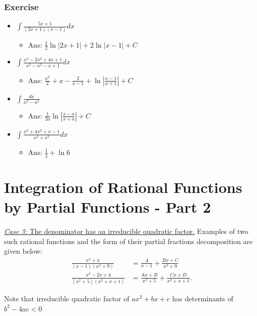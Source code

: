 \documentclass[t]{beamer}
\theoremstyle{plain}
\theoremstyle{definition}
\begin{document}
\begin{frame}
\frametitle{Exercise}

\begin{itemize}
	\item $\displaystyle\int\frac{5x + 1}{(2x + 1)(x-1)}dx$ %
	\begin{itemize}
		\item Ans: $\frac{1}{2}\ln|2x + 1| + 2 \ln|x - 1| + C$
	\end{itemize}
	\item  $\displaystyle\int \frac{x^4 - 2x^2 + 4x + 1}{x^3 - x^2 - x + 1}dx$ %
	\begin{itemize}
		\item Ans: $\frac{x^2}{2} + x - \frac{2}{x - 1} + \ln{|\frac{x - 1}{x + 1}|} + C$
	\end{itemize}
	\item$\displaystyle\int\frac{dx}{x^2 - a^2}$  %
	\begin{itemize}
		\item Ans: $\frac{1}{2a}\ln{\left|\frac{x - a}{x + a}\right|} + C$
	\end{itemize}
	\item $\displaystyle\int\frac{x^3 + 4x^2 + x - 1}{x^3 + x^2}dx$ %
	\begin{itemize}
		\item Ans: $\frac{1}{2} + \ln 6$
	\end{itemize}
\end{itemize}

\end{frame}

\section{Integration of Rational Functions by Partial Functions - Part 2}


\begin{frame}
\noindent\underline{\textit{Case 3:} The denominator has an irreducible quadratic factor.}
Examples of two such rational functions and the form of their partial fractions decomposition are given below:
\begin{align*}
\frac{x^2+x}{(x-1)(x^2+9)}&= {\frac{A}{x-1}+\frac{Bx+C}{x^2+9}}\\
\frac{x^3-2x+4}{(x^2+5)(x^2+x+1)}&= {\frac{Ax+B}{x^2+5}+\frac{Cx+D}{x^2+x+1}}.
\end{align*}

Note that irreducible quadratic factor of $ax^2 + bx + c$ has determinants of $b^2 - 4ac < 0$

\end{frame}
\end{document}
